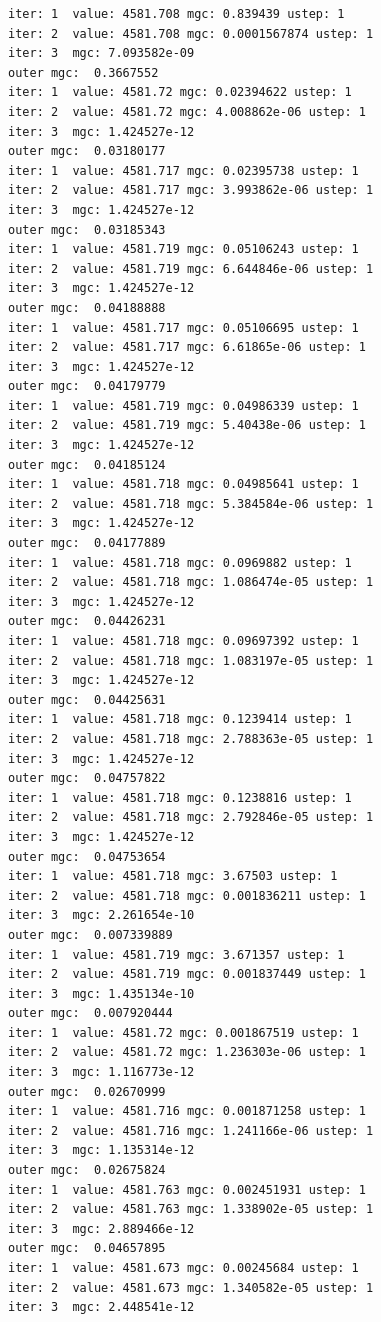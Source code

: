 \documentclass[
  letterpaper,
  DIV=11,
  numbers=noendperiod]{scrartcl}
\begin{document}
\begin{verbatim}
iter: 1  value: 4581.708 mgc: 0.839439 ustep: 1 
iter: 2  value: 4581.708 mgc: 0.0001567874 ustep: 1 
iter: 3  mgc: 7.093582e-09 
outer mgc:  0.3667552 
iter: 1  value: 4581.72 mgc: 0.02394622 ustep: 1 
iter: 2  value: 4581.72 mgc: 4.008862e-06 ustep: 1 
iter: 3  mgc: 1.424527e-12 
outer mgc:  0.03180177 
iter: 1  value: 4581.717 mgc: 0.02395738 ustep: 1 
iter: 2  value: 4581.717 mgc: 3.993862e-06 ustep: 1 
iter: 3  mgc: 1.424527e-12 
outer mgc:  0.03185343 
iter: 1  value: 4581.719 mgc: 0.05106243 ustep: 1 
iter: 2  value: 4581.719 mgc: 6.644846e-06 ustep: 1 
iter: 3  mgc: 1.424527e-12 
outer mgc:  0.04188888 
iter: 1  value: 4581.717 mgc: 0.05106695 ustep: 1 
iter: 2  value: 4581.717 mgc: 6.61865e-06 ustep: 1 
iter: 3  mgc: 1.424527e-12 
outer mgc:  0.04179779 
iter: 1  value: 4581.719 mgc: 0.04986339 ustep: 1 
iter: 2  value: 4581.719 mgc: 5.40438e-06 ustep: 1 
iter: 3  mgc: 1.424527e-12 
outer mgc:  0.04185124 
iter: 1  value: 4581.718 mgc: 0.04985641 ustep: 1 
iter: 2  value: 4581.718 mgc: 5.384584e-06 ustep: 1 
iter: 3  mgc: 1.424527e-12 
outer mgc:  0.04177889 
iter: 1  value: 4581.718 mgc: 0.0969882 ustep: 1 
iter: 2  value: 4581.718 mgc: 1.086474e-05 ustep: 1 
iter: 3  mgc: 1.424527e-12 
outer mgc:  0.04426231 
iter: 1  value: 4581.718 mgc: 0.09697392 ustep: 1 
iter: 2  value: 4581.718 mgc: 1.083197e-05 ustep: 1 
iter: 3  mgc: 1.424527e-12 
outer mgc:  0.04425631 
iter: 1  value: 4581.718 mgc: 0.1239414 ustep: 1 
iter: 2  value: 4581.718 mgc: 2.788363e-05 ustep: 1 
iter: 3  mgc: 1.424527e-12 
outer mgc:  0.04757822 
iter: 1  value: 4581.718 mgc: 0.1238816 ustep: 1 
iter: 2  value: 4581.718 mgc: 2.792846e-05 ustep: 1 
iter: 3  mgc: 1.424527e-12 
outer mgc:  0.04753654 
iter: 1  value: 4581.718 mgc: 3.67503 ustep: 1 
iter: 2  value: 4581.718 mgc: 0.001836211 ustep: 1 
iter: 3  mgc: 2.261654e-10 
outer mgc:  0.007339889 
iter: 1  value: 4581.719 mgc: 3.671357 ustep: 1 
iter: 2  value: 4581.719 mgc: 0.001837449 ustep: 1 
iter: 3  mgc: 1.435134e-10 
outer mgc:  0.007920444 
iter: 1  value: 4581.72 mgc: 0.001867519 ustep: 1 
iter: 2  value: 4581.72 mgc: 1.236303e-06 ustep: 1 
iter: 3  mgc: 1.116773e-12 
outer mgc:  0.02670999 
iter: 1  value: 4581.716 mgc: 0.001871258 ustep: 1 
iter: 2  value: 4581.716 mgc: 1.241166e-06 ustep: 1 
iter: 3  mgc: 1.135314e-12 
outer mgc:  0.02675824 
iter: 1  value: 4581.763 mgc: 0.002451931 ustep: 1 
iter: 2  value: 4581.763 mgc: 1.338902e-05 ustep: 1 
iter: 3  mgc: 2.889466e-12 
outer mgc:  0.04657895 
iter: 1  value: 4581.673 mgc: 0.00245684 ustep: 1 
iter: 2  value: 4581.673 mgc: 1.340582e-05 ustep: 1 
iter: 3  mgc: 2.448541e-12 

\end{verbatim}
\end{document}
